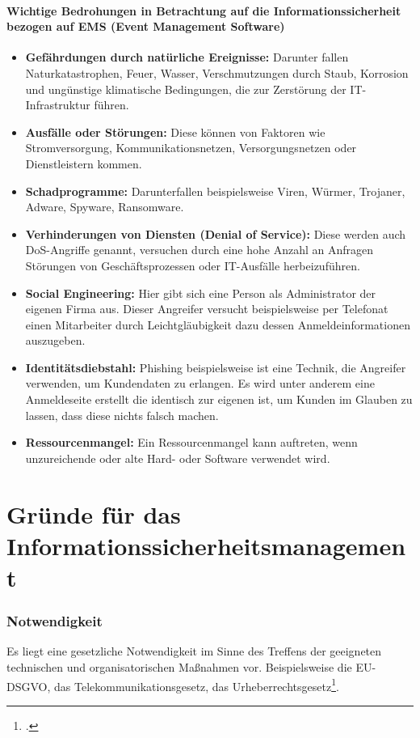 \paragraph{Wichtige Bedrohungen in Betrachtung auf die Informationssicherheit bezogen auf EMS (Event Management Software)} %
\begin{itemize}
	\item \textbf{Gefährdungen durch natürliche Ereignisse:} Darunter fallen Naturkatastrophen, Feuer, Wasser, Verschmutzungen durch Staub, Korrosion und ungünstige klimatische Bedingungen, die zur Zerstörung der IT-Infrastruktur führen.
	\item \textbf{Ausfälle oder Störungen:} Diese können von Faktoren wie Stromversorgung, Kommunikationsnetzen, Versorgungsnetzen oder Dienstleistern kommen.
	\item \textbf{Schadprogramme:} Darunterfallen beispielsweise Viren, Würmer, Trojaner, Adware, Spyware, Ransomware.
	\item \textbf{Verhinderungen von Diensten (Denial of Service):} Diese werden auch DoS-Angriffe genannt, versuchen durch eine hohe Anzahl an Anfragen Störungen von Geschäftsprozessen oder IT-Ausfälle herbeizuführen.
	\item \textbf{Social Engineering:} Hier gibt sich eine Person als Administrator der eigenen Firma aus. Dieser Angreifer versucht beispielsweise per Telefonat einen Mitarbeiter durch Leichtgläubigkeit dazu dessen Anmeldeinformationen auszugeben.
	\item \textbf{Identitätsdiebstahl:} Phishing beispielsweise ist eine Technik, die Angreifer verwenden, um Kundendaten zu erlangen. Es wird unter anderem eine Anmeldeseite erstellt die identisch zur eigenen ist, um Kunden im Glauben zu lassen, dass diese nichts falsch machen.
	\item \textbf{Ressourcenmangel:} Ein Ressourcenmangel kann auftreten, wenn unzureichende oder alte Hard- oder Software verwendet wird. 
\end{itemize}

\section{Gründe für das Informationssicherheitsmanagement}
\subsubsection{Notwendigkeit}
Es liegt eine gesetzliche Notwendigkeit im Sinne des Treffens der geeigneten technischen und organisatorischen Maßnahmen vor. Beispielsweise die EU-DSGVO, das Telekommunikationsgesetz, das Urheberrechtsgesetz\footcite{Lehrunterlagen-HTL-cloud}.



